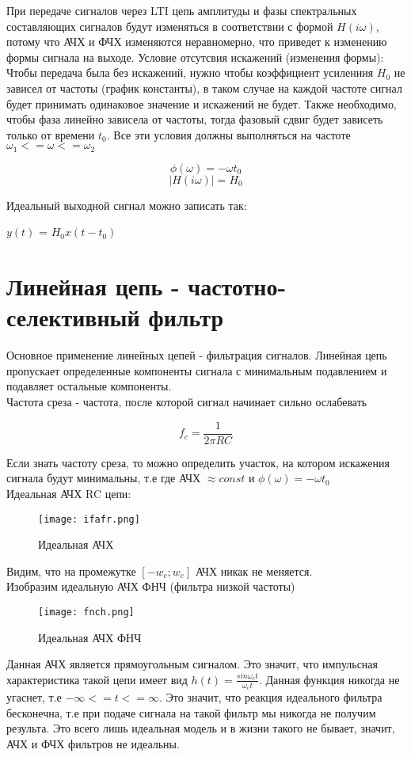 При передаче сигналов через LTI цепь амплитуды и фазы спектральных составляющих сигналов будут изменяться в соответствии с формой
$H(i\omega)$, потому что АЧХ и ФЧХ изменяются неравномерно, что приведет к изменению формы сигнала на выходе. Условие отсутсвия искажений (изменения формы): \\

Чтобы передача была без искажений, нужно чтобы коэффициент усилениия $H_0$ не зависел от частоты (график константы), в таком случае
на каждой частоте сигнал будет принимать одинаковое значение и искажений не будет. Также необходимо, чтобы фаза линейно зависела 
от частоты, тогда фазовый сдвиг будет зависеть только от времени $t_0$. Все эти условия должны выполняться на частоте $\omega_1 <= \omega <= \omega_2$

$$\phi(\omega) = -\omega t_0$$ 
$$|H(i\omega)| = H_0$$ 

Идеальный выходной сигнал можно записать так:

$y(t)$ = $H_0x(t - t_0)$

\section*{Линейная цепь - частотно-селективный фильтр}

Основное применение линейных цепей - фильтрация сигналов. Линейная цепь пропускает определенные компоненты сигнала с 
минимальным подавлением и подавляет остальные компоненты. \\

Частота среза - частота, после которой сигнал начинает сильно ослабевать

$$\boxed{f_c = \frac{1}{2\pi RC}}$$

Если знать частоту среза, то можно определить участок, на котором искажения сигнала будут минимальны, т.е где АЧХ $\approx const$
и $\phi(\omega) = -\omega t_0$ \\

Идеальная АЧХ RC цепи:

\begin{figure}[H]
    \centering
    \texttt{[image: ifafr.png]}
    \caption{Идеальная АЧХ}
\end{figure}

Видим, что на промежутке $[-w_c;w_c]$ АЧХ никак не меняется. \\

Изобразим идеальную АЧХ ФНЧ (фильтра низкой частоты)

\begin{figure}[H]
    \centering
    \texttt{[image: fnch.png]}
    \caption{Идеальная АЧХ ФНЧ} 
\end{figure}

Данная АЧХ является прямоугольным сигналом. Это значит, что импульсная характеристика такой цепи имеет вид $h(t) = \frac{sin\omega_ct}{\omega_ct}$.
Данная функция никогда не угаснет, т.е $-\infty <= t <= \infty$. Это значит, что реакция идеального фильтра бесконечна, т.е при подаче
сигнала на такой фильтр мы никогда не получим результа. Это всего лишь идеальная модель и в жизни такого не бывает, значит, 
АЧХ и ФЧХ фильтров не идеальны.



\endinput